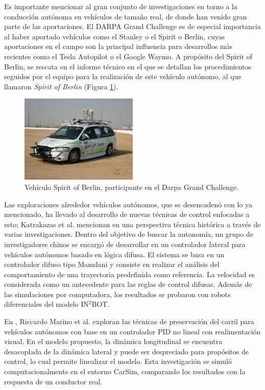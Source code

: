 \par Es importante mencionar al gran conjunto de investigaciones en torno a la conducción autónoma en vehículos de tamaño real, de donde han venido gran parte de las aportaciones. El DARPA Grand Challenge es de especial importancia al haber aportado vehículos como el Stanley o el Spirit o Berlin, cuyas aportaciones en el campo son la principal influencia para desarrollos más recientes como el Tesla Autopilot o el Google Waymo. A propósito del Spirit of Berlin, se rescata en \cite{javierrojoSpiritBerlinAutonomous2017} el informe técnico en el que se detallan los procedimientos seguidos por el equipo para la realización de este vehículo autónomo, al que llamaron {\it Spirit of Berlin} (Figura \ref{fig:Spirit}).
\begin{figure}[htbp!]
	\centering
	\includegraphics[width=0.5\textwidth]{./Figuras/SoB}
	\caption{Vehículo Spirit of Berlin, participante en el Darpa Grand Challenge.}
	\label{fig:Spirit}
\end{figure}
\par Las exploraciones alrededor vehículos autónomos, que se desencadenó con lo ya mencionado, ha llevado al desarrollo de nuevas técnicas de control enfocadas a esto; Katrakazas et al. mencionan en \cite{katrakazasRealtimeMotionPlanning2015} una perspectiva técnica histórica a través de varias investigaciones. Dentro del objetivo de buscar la autonomía, un grupo de investigadores chinos se encargó de desarrollar en \cite{wangLateralControlAutonomous2015} un controlador lateral para vehículos autónomos basado en lógica difusa. El sistema se basa en un controlador difuso tipo Mamdani y consiste en realizar el análisis del comportamiento de una trayectoria predefinida como referencia. La velocidad es considerada como un antecedente para las reglas de control difusas. Además de las simulaciones por computadora, los resultados se probaron con robots diferenciales del modelo IN$^{2}$BOT.
\par En \cite{marinoNestedPIDSteering2011}, Riccardo Marino et al. exploran las técnicas de preservación del carril para vehículos autónomos con base en un controlador PID no lineal con realimentación visual. En el modelo propuesto, la dinámica longitudinal se encuentra desacoplada de la dinámica lateral y puede ser despreciado para propósitos de control, lo cual permite linealizar el modelo. Esta investigación se simuló computacionalmente en el entorno CarSim, comparando los resultados con la respuesta de un conductor real. 
